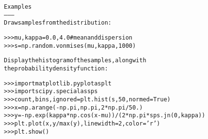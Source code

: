 \begin{boxedminipage}{\funcwidth}
\begin{alltt}
Examples
--------
Draw samples from the distribution:

{\textgreater}{\textgreater}{\textgreater} mu, kappa = 0.0, 4.0 \# mean and dispersion
{\textgreater}{\textgreater}{\textgreater} s = np.random.vonmises(mu, kappa, 1000)

Display the histogram of the samples, along with
the probability density function:

{\textgreater}{\textgreater}{\textgreater} import matplotlib.pyplot as plt
{\textgreater}{\textgreater}{\textgreater} import scipy.special as sps
{\textgreater}{\textgreater}{\textgreater} count, bins, ignored = plt.hist(s, 50, normed=True)
{\textgreater}{\textgreater}{\textgreater} x = np.arange(-np.pi, np.pi, 2*np.pi/50.)
{\textgreater}{\textgreater}{\textgreater} y = -np.exp(kappa*np.cos(x-mu))/(2*np.pi*sps.jn(0,kappa))
{\textgreater}{\textgreater}{\textgreater} plt.plot(x, y/max(y), linewidth=2, color='r')
{\textgreater}{\textgreater}{\textgreater} plt.show()
\end{alltt}

\setlength{\parskip}{1ex}
    \end{boxedminipage}

    \label{trunk:qstkutil:bollinger:wald}

    \vspace{0.5ex}

